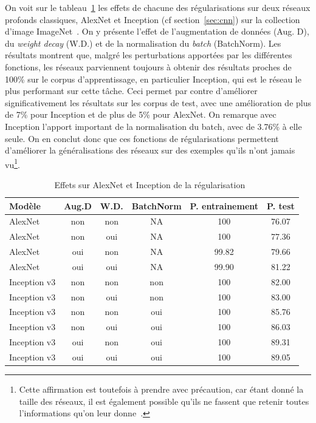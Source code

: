 On voit sur le tableau~\ref{tab:regularization} les effets de chacune des régularisations sur deux réseaux profonds classiques, AlexNet et Inception (cf section~\ref{sec:cnn}) sur la collection d'image ImageNet~\cite{deng2009imagenet}.
On y présente l'effet de l'augmentation de données (Aug. D), du \textit{weight decay} (W.D.) et de la normalisation du \textit{batch} (BatchNorm).
Les résultats montrent que, malgré les perturbations apportées par les différentes fonctions, les réseaux parviennent toujours à obtenir des résultats proches de 100\% sur le corpus d'apprentissage, en particulier Inception, qui est le réseau le plus performant sur cette tâche.
Ceci permet par contre d'améliorer significativement les résultats sur les corpus de test, avec une amélioration de plus de 7\% pour Inception et de plus de 5\% pour AlexNet.
On remarque avec Inception l’apport important de la normalisation du batch, avec de 3.76\% à elle seule.
On en conclut donc que ces fonctions de régularisations permettent d'améliorer la généralisations des réseaux sur des exemples qu'ils n'ont jamais vu\footnote{Cette affirmation est toutefois à prendre avec précaution, car étant donné la taille des réseaux, il est également possible qu'ils ne fassent que retenir toutes l'informations qu'on leur donne~\cite{zhang2016understanding}.}.


\begin{table}%
\centering
\begin{tabular}{|l||c|c|c||c|c|}
\hline
Modèle & Aug.D & W.D. & BatchNorm & P. entrainement & P. test \\
\hline
AlexNet & non & non & NA & 100 & 76.07 \\
AlexNet & non & oui & NA & 100 & 77.36 \\
AlexNet & oui & non & NA & 99.82 & 79.66 \\
AlexNet & oui & oui & NA & 99.90 & 81.22 \\
\hline
Inception v3 & non & non & non & 100 & 82.00 \\
Inception v3 & non & oui & non & 100 & 83.00 \\
Inception v3 & non & non & oui & 100 & 85.76 \\
Inception v3 & non & oui & oui & 100 & 86.03 \\
Inception v3 & oui & non & oui & 100 & 89.31 \\
Inception v3 & oui & oui & oui & 100 & 89.05 \\
\hline
\end{tabular}
\caption{Effets sur AlexNet et Inception de la régularisation~\cite{zhang2016understanding}}
\label{tab:regularization}
\end{table}







